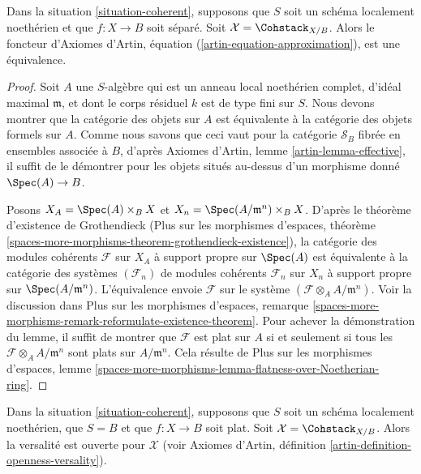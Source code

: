 \begin{lemma}
\label{lemma-coherent-existence}
Dans la situation \ref{situation-coherent}, supposons que $S$ soit un schéma
localement noethérien et que $f : X \to B$ soit séparé. Soit
$\mathcal{X} = \Cohstack_{X/B}$. Alors le foncteur d'Axiomes d'Artin,
équation (\ref{artin-equation-approximation}), est une équivalence.
\end{lemma}

\begin{proof}
Soit $A$ une $S$-algèbre qui est un anneau local noethérien complet, d'idéal
maximal $\mathfrak m$, et dont le corps résiduel $k$ est de type fini sur $S$.
Nous devons montrer que la catégorie des objets sur $A$ est équivalente à la
catégorie des objets formels sur $A$. Comme nous savons que ceci vaut pour la
catégorie $\mathcal{S}_B$ fibrée en ensembles associée à $B$, d'après Axiomes
d'Artin, lemme \ref{artin-lemma-effective}, il suffit de le démontrer pour les
objets situés au-dessus d'un morphisme donné $\Spec(A) \to B$.

\medskip\noindent
Posons $X_A = \Spec(A) \times_B X$ et
$X_n = \Spec(A/\mathfrak m^n) \times_B X$. D'après le théorème d'existence de
Grothendieck (Plus sur les morphismes d'espaces, théorème
\ref{spaces-more-morphisms-theorem-grothendieck-existence}), la catégorie des
modules cohérents $\mathcal{F}$ sur $X_A$ à support propre sur $\Spec(A)$ est
équivalente à la catégorie des systèmes $(\mathcal{F}_n)$ de modules cohérents
$\mathcal{F}_n$ sur $X_n$ à support propre sur
$\Spec(A/\mathfrak m^n)$. L'équivalence envoie $\mathcal{F}$ sur le système
$(\mathcal{F} \otimes_A A/\mathfrak m^n)$. Voir la discussion dans Plus sur
les morphismes d'espaces, remarque
\ref{spaces-more-morphisms-remark-reformulate-existence-theorem}. Pour achever
la démonstration du lemme, il suffit de montrer que $\mathcal{F}$ est plat sur
$A$ si et seulement si tous les $\mathcal{F} \otimes_A A/\mathfrak m^n$ sont
plats sur $A/\mathfrak m^n$. Cela résulte de Plus sur les morphismes d'espaces,
lemme \ref{spaces-more-morphisms-lemma-flatness-over-Noetherian-ring}.
\end{proof}

\begin{lemma}
\label{lemma-coherent-defo-thy}
Dans la situation \ref{situation-coherent}, supposons que $S$ soit un schéma
localement noethérien, que $S = B$ et que $f : X \to B$ soit plat. Soit
$\mathcal{X} = \Cohstack_{X/B}$. Alors la versalité est ouverte pour
$\mathcal{X}$ (voir Axiomes d'Artin, définition
\ref{artin-definition-openness-versality}).
\end{lemma}


